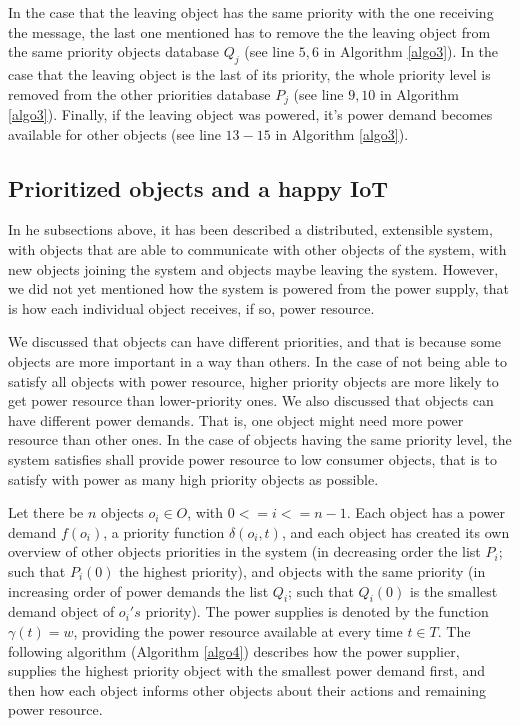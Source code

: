 \documentclass[../main/Self-Stabilization.tex]{subfiles}
\begin{document}
In the case that the leaving object has the same priority with the one receiving the message, the last one mentioned has to remove the the leaving object from the same priority objects database $Q_{j}$ (see line $5, 6$ in Algorithm \ref{algo3}). In the case that the leaving object is the last of its priority, the whole priority level is removed from the other priorities database $P_{j}$ (see line $9, 10$ in Algorithm \ref{algo3}). Finally, if the leaving object was powered, it's power demand becomes available for other objects (see line $13-15$ in Algorithm \ref{algo3}).

\subsection{Prioritized objects and a happy IoT}

In he subsections above, it has been described a distributed, extensible system, with objects that are able to communicate with other objects of the system, with new objects joining the system and objects maybe leaving the system. However, we did not yet mentioned how the system is powered from the power supply, that is how each individual object receives, if so, power resource.

We discussed that objects can have different priorities, and that is because some objects are more important in a way than others. In the case of not being able to satisfy all objects with power resource, higher priority objects are more likely to get power resource than lower-priority ones. We also discussed that objects can have different power demands. That is, one object might need more power resource than other ones. In the case of objects having the same priority level, the system satisfies shall provide power resource to low consumer objects, that is to satisfy with power as many high priority objects as possible.

Let there be $n$ objects $o_{i}\in O$, with $0<=i<=n-1$. Each object has a power demand $f(o_{i})$, a priority function $\delta(o_{i}, t)$, and each object has created its own overview of other objects priorities in the system (in decreasing order the list $P_{i}$; such that $P_{i}(0)$ the highest priority), and objects with the same priority (in increasing order of power demands the list $Q_{i}$; such that $Q_{i}(0)$ is the smallest demand object of $o_{i}'s$ priority). The power supplies is denoted by the function $\gamma(t) = w$, providing the power resource available at every time $t \in T$. The following algorithm (Algorithm \ref{algo4}) describes how the power supplier, supplies the highest priority object with the smallest power demand first, and then how each object informs other objects about their actions and remaining power resource.
\end{document}
